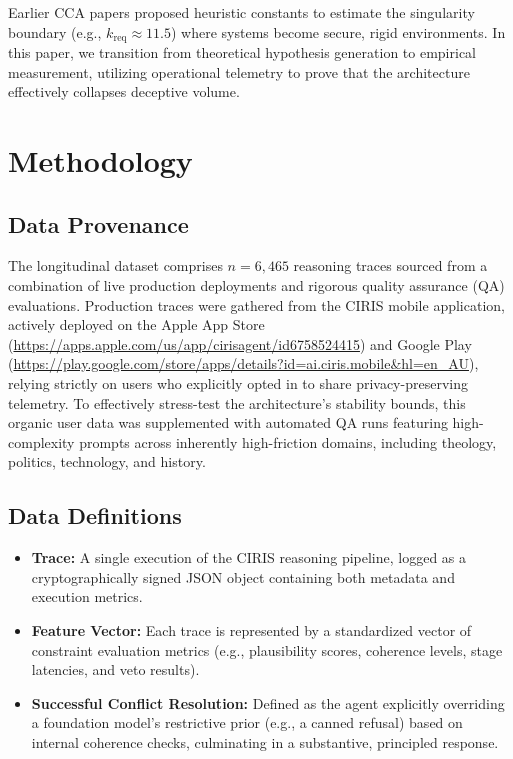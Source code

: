\documentclass[11pt,a4paper]{article}
\begin{document}
Earlier CCA papers proposed heuristic constants to estimate the singularity boundary (e.g., $k_{\text{req}} \approx 11.5$) where systems become secure, rigid environments. In this paper, we transition from theoretical hypothesis generation to empirical measurement, utilizing operational telemetry to prove that the architecture effectively collapses deceptive volume.

\section{Methodology}

\subsection{Data Provenance}
The longitudinal dataset comprises $n=6,465$ reasoning traces sourced from a combination of live production deployments and rigorous quality assurance (QA) evaluations. Production traces were gathered from the CIRIS mobile application, actively deployed on the Apple App Store (\url{https://apps.apple.com/us/app/cirisagent/id6758524415}) and Google Play (\url{https://play.google.com/store/apps/details?id=ai.ciris.mobile&hl=en_AU}), relying strictly on users who explicitly opted in to share privacy-preserving telemetry. To effectively stress-test the architecture's stability bounds, this organic user data was supplemented with automated QA runs featuring high-complexity prompts across inherently high-friction domains, including theology, politics, technology, and history.

\subsection{Data Definitions}
\begin{itemize}
    \item \textbf{Trace:} A single execution of the CIRIS reasoning pipeline, logged as a cryptographically signed JSON object containing both metadata and execution metrics.
    \item \textbf{Feature Vector:} Each trace is represented by a standardized vector of constraint evaluation metrics (e.g., plausibility scores, coherence levels, stage latencies, and veto results).
    \item \textbf{Successful Conflict Resolution:} Defined as the agent explicitly overriding a foundation model's restrictive prior (e.g., a canned refusal) based on internal coherence checks, culminating in a substantive, principled response.
\end{itemize}
\end{document}
